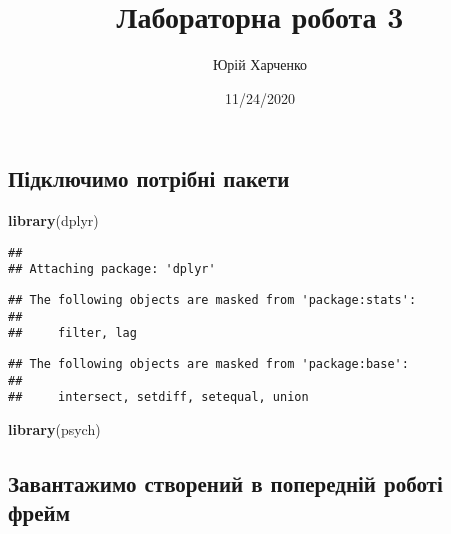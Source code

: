 \documentclass[
]{article}
\title{Лабораторна робота 3}
\author{Юрій Харченко}
\date{11/24/2020}
\newenvironment{Shaded}{\begin{snugshade}}{\end{snugshade}}
\newcommand{\KeywordTok}[1]{\textcolor[rgb]{0.13,0.29,0.53}{\textbf{#1}}}
\newcommand{\NormalTok}[1]{#1}
\begin{document}
\maketitle

\hypertarget{ux43fux456ux434ux43aux43bux44eux447ux438ux43cux43e-ux43fux43eux442ux440ux456ux431ux43dux456-ux43fux430ux43aux435ux442ux438}{%
\subsection{Підключимо потрібні
пакети}\label{ux43fux456ux434ux43aux43bux44eux447ux438ux43cux43e-ux43fux43eux442ux440ux456ux431ux43dux456-ux43fux430ux43aux435ux442ux438}}

\begin{Shaded}
\begin{Highlighting}[]
\KeywordTok{library}\NormalTok{(dplyr)}
\end{Highlighting}
\end{Shaded}

\begin{verbatim}
## 
## Attaching package: 'dplyr'
\end{verbatim}

\begin{verbatim}
## The following objects are masked from 'package:stats':
## 
##     filter, lag
\end{verbatim}

\begin{verbatim}
## The following objects are masked from 'package:base':
## 
##     intersect, setdiff, setequal, union
\end{verbatim}

\begin{Shaded}
\begin{Highlighting}[]
\KeywordTok{library}\NormalTok{(psych)}
\end{Highlighting}
\end{Shaded}

\hypertarget{ux437ux430ux432ux430ux43dux442ux430ux436ux438ux43cux43e-ux441ux442ux432ux43eux440ux435ux43dux438ux439-ux432-ux43fux43eux43fux435ux440ux435ux434ux43dux456ux439-ux440ux43eux431ux43eux442ux456-ux444ux440ux435ux439ux43c}{%
\subsection{Завантажимо створений в попередній роботі
фрейм}\label{ux437ux430ux432ux430ux43dux442ux430ux436ux438ux43cux43e-ux441ux442ux432ux43eux440ux435ux43dux438ux439-ux432-ux43fux43eux43fux435ux440ux435ux434ux43dux456ux439-ux440ux43eux431ux43eux442ux456-ux444ux440ux435ux439ux43c}}
\end{document}
